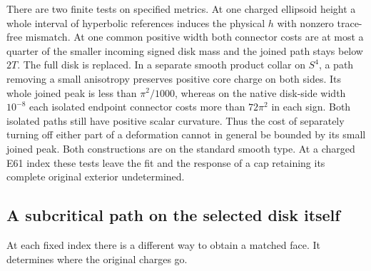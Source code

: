 \documentclass[11pt,letterpaper]{article}
\numberwithin{equation}{section}
\begin{document}
There are two finite tests on specified metrics. At one charged
ellipsoid height a whole interval of hyperbolic references induces
the physical \(h\) with nonzero trace-free mismatch. At one common
positive width both connector costs are at most a quarter of the
smaller incoming signed disk mass and the joined path stays below
\(2T\). The full disk is replaced. In a separate smooth product
collar on \(S^4\), a path removing a small anisotropy preserves
positive core charge on both sides. Its whole joined peak is less
than \(\pi^2/1000\), whereas on the native disk-side width
\(10^{-8}\) each isolated endpoint connector costs more than
\(72\pi^2\) in each sign. Both isolated paths still have positive
scalar curvature. Thus the cost of separately turning off either
part of a deformation cannot in general be bounded by its small
joined peak. Both constructions are on the standard smooth type.
At a charged E61 index these tests leave the fit and the response
of a cap retaining its complete original exterior undetermined.

\subsection{A subcritical path on the selected disk itself}\label{sec:disk-transport}
At each fixed index there is a different way to obtain a matched
face. It determines where the original charges go.
\end{document}
